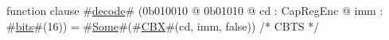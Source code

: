 function clause #\hyperref[sailMIPSzdecode]{decode}# (0b010010 @ 0b01010 @ cd : CapRegEnc @ imm : #\hyperref[sailMIPSzbits]{bits}#(16)) = #\hyperref[sailMIPSzSome]{Some}#(#\hyperref[sailMIPSzCBX]{CBX}#(cd, imm, false)) /* CBTS */
